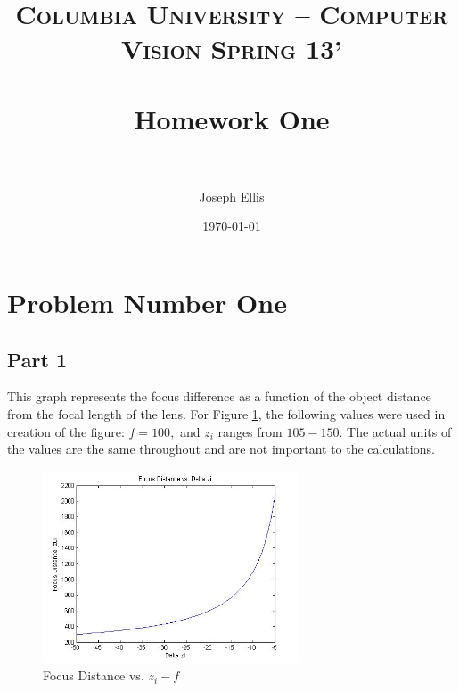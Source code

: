 \documentclass[paper=a4, fontsize=11pt]{scrartcl} %
\title{	
\normalfont \normalsize 
\textsc{Columbia University -- Computer Vision Spring 13'} \\ [25pt] %
\horrule{0.5pt} \\[0.4cm] %
\huge Homework One \\ %
\horrule{2pt} \\[0.5cm] %
}
\author{Joseph Ellis} %
\date{\normalsize\today} %
\numberwithin{equation}{section} %
\numberwithin{figure}{section} %
\numberwithin{table}{section} %
\begin{document}
\maketitle %


\section{Problem Number One}

\subsection{Part 1}
This graph represents the focus difference as a function of the object distance from the focal length of the lens.
For Figure \ref{Part 1}, the following values were used in creation of the figure: \begin{math} f = 100,\end{math} and \begin{math}z_{i}\end{math} ranges from \begin{math} 105-150\end{math}.
The actual units of the values are the same throughout and are not important to the calculations.

\begin{figure}
\centering
\includegraphics[width=3in]{prob11.jpg}
\caption{Focus Distance vs. \begin{math}z_{i}-f\end{math}}
\label{Part 1}
\end{figure}
\end{document}
